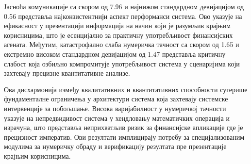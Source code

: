 Јасноћа комуникације са скором од 7.96 и најнижом стандардном девијацијом од 0.56 представља најконзистентнији аспект перформанси система. Ово указује на ефикасност у презентацији информација на начин који је разумљив крајњим корисницима, што је есенцијално за практичну употребљивост финансијских агената. Међутим, катастрофално слаба нумеричка тачност са скором од 1.65 и екстремно високом стандардном девијацијом од 1.47 представља критичну слабост која озбиљно компромитује употребљивост система у сценаријима који захтевају прецизне квантитативне анализе.

Ова дисхармонија између квалитативних и квантитативних способности сугерише фундаменталне ограничења у архитектури система која захтевају системске интервенције за побољшање. Висока варијабилност у нумеричкој тачности указује на непредвидивост система у хендловању математичких операција и израчуна, што представља неприхватљив ризик за финансијске апликације где је прецизност императив. Ови резултати имплицирају потребу за специјализованим модулима за нумеричку обраду и верификацију резултата пре презентације крајњим корисницима.
